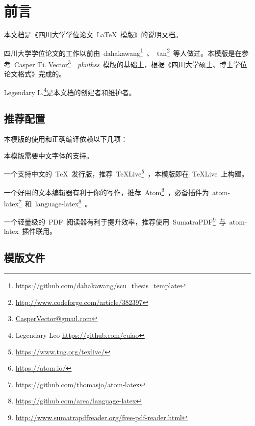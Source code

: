 \chapter{前言}
本文档是《四川大学学位论文~\LaTeX~模版》的说明文档。


四川大学学位论文的工作以前由~dahakawang\footnote{\url{https://github.com/dahakawang/scu_thesis_template}}~、~tan\footnote{\url{http://www.codeforge.com/article/382397}}~等人做过。本模版是在参考~Casper Ti. Vector\footnote{\url{CasperVector@gmail.com}}~~\emph{pkuthss}~模版\cite{pkuthss}的基础上，根据《四川大学硕士、博士学位论文格式》\cite{SCUDissertationFormat}完成的。


Legendary L.\footnote{Legendary Leo \url{https://github.com/cuiao}}是本文档的创建者和维护者。

\section{推荐配置}
本模版的使用和正确编译依赖以下几项：
\begin{description}[style=sameline,labelindent=2em,labelwidth=!]
	\item[中文字体] 本模版需要中文字体的支持。
	\item[\TeX~发行版] 一个支持中文的~\TeX~发行版，推荐~\TeX Live\footnote{\url{https://www.tug.org/texlive/}}~，本模版即在~\TeX Live~上构建。
	\item[文本编辑器] 一个好用的文本编辑器有利于你的写作，推荐~Atom\footnote{\url{https://atom.io/}}~，必备插件为~atom-latex\footnote{\url{https://github.com/thomasjo/atom-latex}}~和~language-latex\footnote{\url{https://github.com/area/language-latex}}~。
	\item[PDF~阅读器] 一个轻量级的~PDF~阅读器有利于提升效率，推荐使用~SumatraPDF\footnote{\url{http://www.sumatrapdfreader.org/free-pdf-reader.html}}~与~atom-latex~插件联用。
\end{description}


\section{模版文件}

